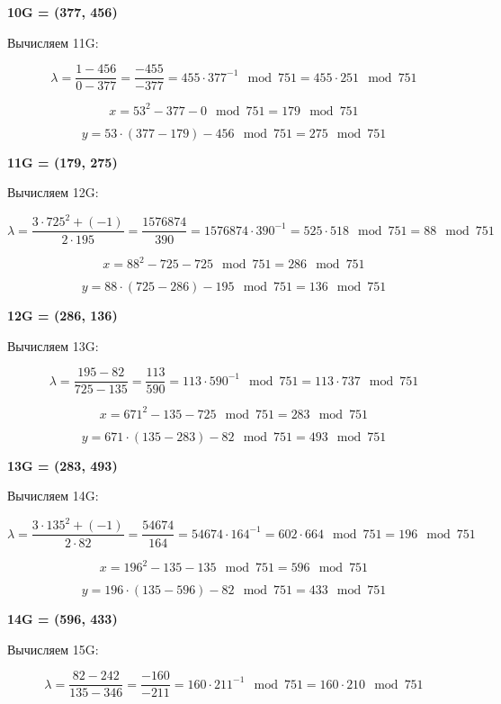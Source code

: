 \textbf{10G = (377, 456)}

Вычисляем 11G:

            \[
            \lambda = \frac{1-456}{0-377} = \frac{-455}{-377} = 455 \cdot 377^{-1}\mod{751} = 455 \cdot 251\mod{751}
            \]
            

        \[
        x = 53^2 - 377 - 0 \mod{751} = 179\mod{751}
        \]
        

        \[
        y = 53 \cdot (377 - 179) - 456\mod{751} = 275\mod{751}
        \]
        
\textbf{11G = (179, 275)}

Вычисляем 12G:

            \[
            \lambda = \frac{ 3 \cdot 725^2 + (-1) }{2 \cdot 195} = \frac{1576874}{390} = 1576874 \cdot 390^{-1} = 525 \cdot 518\mod{751} = 88\mod{751}
            \]
            

        \[
        x = 88^2 - 725 - 725 \mod{751} = 286\mod{751}
        \]
        

        \[
        y = 88 \cdot (725 - 286) - 195\mod{751} = 136\mod{751}
        \]
        
\textbf{12G = (286, 136)}

Вычисляем 13G:

            \[
            \lambda = \frac{195-82}{725-135} = \frac{113}{590} = 113 \cdot 590^{-1}\mod{751} = 113 \cdot 737\mod{751}
            \]
            

        \[
        x = 671^2 - 135 - 725 \mod{751} = 283\mod{751}
        \]
        

        \[
        y = 671 \cdot (135 - 283) - 82\mod{751} = 493\mod{751}
        \]
        
\textbf{13G = (283, 493)}

Вычисляем 14G:

            \[
            \lambda = \frac{ 3 \cdot 135^2 + (-1) }{2 \cdot 82} = \frac{54674}{164} = 54674 \cdot 164^{-1} = 602 \cdot 664\mod{751} = 196\mod{751}
            \]
            

        \[
        x = 196^2 - 135 - 135 \mod{751} = 596\mod{751}
        \]
        

        \[
        y = 196 \cdot (135 - 596) - 82\mod{751} = 433\mod{751}
        \]
        
\textbf{14G = (596, 433)}

Вычисляем 15G:

            \[
            \lambda = \frac{82-242}{135-346} = \frac{-160}{-211} = 160 \cdot 211^{-1}\mod{751} = 160 \cdot 210\mod{751}
            \]
            


